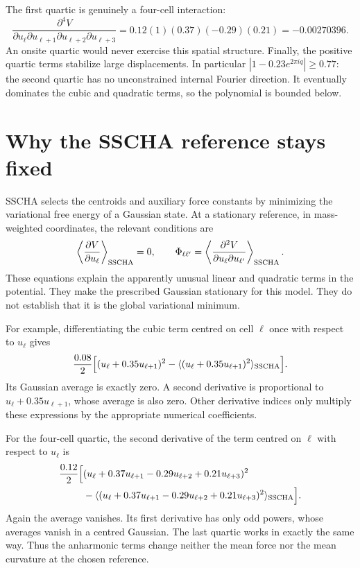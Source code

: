 \documentclass[11pt,a4paper]{article}
\newcommand{\pageheading}[1]{\clearpage\section{#1}}
\begin{document}
The first quartic is genuinely a four-cell interaction:
\begin{equation}
 \frac{\partial^4 V}
 {\partial u_\ell\partial u_{\ell+1}\partial u_{\ell+2}\partial u_{\ell+3}}
 =0.12(1)(0.37)(-0.29)(0.21)=-0.00270396.
\end{equation}
An onsite quartic would never exercise this spatial structure. Finally, the
positive quartic terms stabilize large displacements. In particular
$|1-0.23e^{2\pi iq}|\geq0.77$: the second quartic has no unconstrained internal
Fourier direction. It eventually dominates the cubic and quadratic terms,
so the polynomial is bounded below.

\pageheading{Why the SSCHA reference stays fixed}
SSCHA selects the centroids and auxiliary force constants by minimizing the
variational free energy of a Gaussian state. At a stationary reference, in
mass-weighted coordinates, the relevant conditions are
\begin{equation}
 \left\langle\frac{\partial V}{\partial u_\ell}\right\rangle_{\rm SSCHA}=0,
 \qquad
 \Phi_{\ell\ell'}=
 \left\langle\frac{\partial^2 V}{\partial u_\ell\partial u_{\ell'}}
 \right\rangle_{\rm SSCHA}.
\end{equation}
These equations explain the apparently unusual linear and quadratic terms in
the potential. They make the prescribed Gaussian stationary for this model.
They do not establish that it is the global variational minimum.

For example, differentiating the cubic term centred on cell $\ell$ once with
respect to $u_\ell$ gives
\begin{equation}
 \frac{0.08}{2}\Big[(u_\ell+0.35u_{\ell+1})^2
       -\langle(u_\ell+0.35u_{\ell+1})^2\rangle_{\rm SSCHA}\Big].
\end{equation}
Its Gaussian average is exactly zero. A second derivative is proportional to
$u_\ell+0.35u_{\ell+1}$, whose average is also zero. Other derivative indices
only multiply these expressions by the appropriate numerical coefficients.

For the four-cell quartic, the second derivative of the term centred on $\ell$
with respect to $u_\ell$ is
\begin{align}
 \frac{0.12}{2}\Big[&(u_\ell+0.37u_{\ell+1}-0.29u_{\ell+2}+0.21u_{\ell+3})^2\notag\\
 &-\langle(u_\ell+0.37u_{\ell+1}-0.29u_{\ell+2}+0.21u_{\ell+3})^2
                 \rangle_{\rm SSCHA}\Big].
\end{align}
Again the average vanishes. Its first derivative has only odd powers, whose
averages vanish in a centred Gaussian. The last quartic works in exactly the
same way. Thus the anharmonic terms change neither the mean force nor the
mean curvature at the chosen reference.
\end{document}
